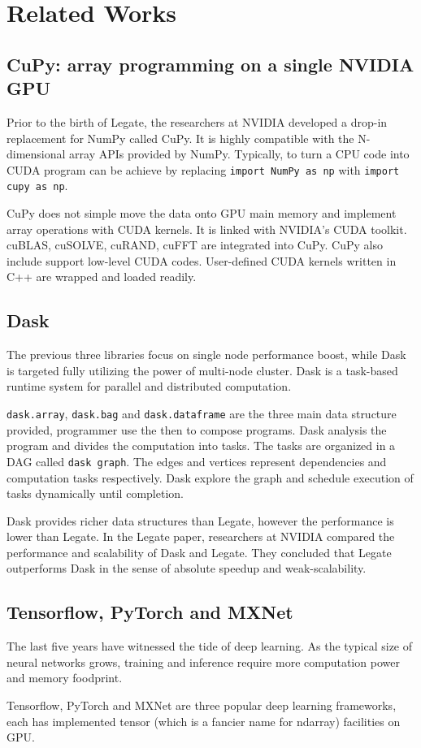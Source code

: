 \documentclass{article}
\newenvironment{newSec}[1]{
	\section{#1}
	\lhead{#1}
}{ \newpage }
\newenvironment{newSubsec}[1]{
	\subsection{#1}
}{}
\begin{document}
\begin{newSec}{Related Works}
	\begin{newSubsec}{CuPy: array programming on a single NVIDIA GPU}
		Prior to the birth of Legate, the researchers at NVIDIA developed a drop-in replacement for NumPy called CuPy\cite{CuPy}.
		It is highly compatible with the N-dimensional array APIs provided by NumPy.
		Typically, to turn a CPU code into CUDA program can be achieve by replacing \texttt{import NumPy as np} with \texttt{import cupy as np}.\par
		CuPy does not simple move the data onto GPU main memory and implement array operations with CUDA kernels.
		It is linked with NVIDIA's CUDA toolkit. {cuBLAS, cuSOLVE, cuRAND, cuFFT} are integrated into CuPy.
		CuPy also include support low-level CUDA codes. User-defined CUDA kernels written in C++ are wrapped and loaded readily.
	\end{newSubsec}

	\begin{newSubsec}{Dask}
		The previous three libraries focus on single node performance boost,
		while Dask\cite{Dask} is targeted fully utilizing the power of multi-node cluster.
		Dask is a task-based runtime system for parallel and distributed computation.\par
		\texttt{dask.array}, \texttt{dask.bag} and \texttt{dask.dataframe} are the three main data structure provided,
		programmer use the then to compose programs.
		Dask analysis the program and divides the computation into tasks.
		The tasks are organized in a DAG called \texttt{dask graph}. The edges and vertices represent dependencies and computation tasks respectively.
		Dask explore the graph and schedule execution of tasks dynamically until completion.\par
		Dask provides richer data structures than Legate, however the performance is lower than Legate.
		In the Legate paper, researchers at NVIDIA compared the performance and scalability of Dask and Legate.
		They concluded that Legate outperforms Dask in the sense of absolute speedup and weak-scalability.
	\end{newSubsec}

	\begin{newSubsec}{Tensorflow, PyTorch and MXNet}
		The last five years have witnessed the tide of deep learning.
		As the typical size of neural networks grows, training and inference require more computation power and memory foodprint.\par
		Tensorflow, PyTorch and MXNet are three popular deep learning frameworks, each has implemented tensor (which is a fancier name for ndarray) facilities on GPU.
	\end{newSubsec}
\end{newSec}
\end{document}
